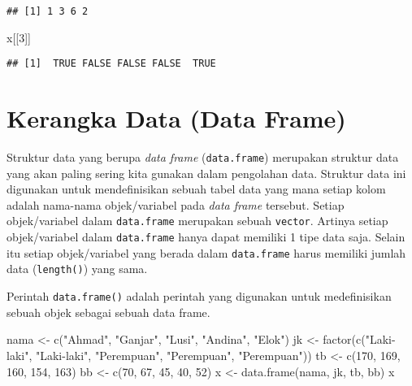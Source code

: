 \documentclass[
]{book}
\newenvironment{Shaded}{\begin{snugshade}}{\end{snugshade}}
\newcommand{\DecValTok}[1]{\textcolor[rgb]{0.00,0.00,0.81}{#1}}
\newcommand{\FunctionTok}[1]{\textcolor[rgb]{0.00,0.00,0.00}{#1}}
\newcommand{\NormalTok}[1]{#1}
\newcommand{\OtherTok}[1]{\textcolor[rgb]{0.56,0.35,0.01}{#1}}
\newcommand{\StringTok}[1]{\textcolor[rgb]{0.31,0.60,0.02}{#1}}
\begin{document}
\begin{verbatim}
## [1] 1 3 6 2
\end{verbatim}

\begin{Shaded}
\begin{Highlighting}[]
\NormalTok{x[[}\DecValTok{3}\NormalTok{]]}
\end{Highlighting}
\end{Shaded}

\begin{verbatim}
## [1]  TRUE FALSE FALSE FALSE  TRUE
\end{verbatim}

\hypertarget{dataframe}{%
\section{Kerangka Data (Data Frame)}\label{dataframe}}

Struktur data yang berupa \emph{data frame} (\texttt{data.frame}) merupakan struktur data yang akan paling sering kita gunakan dalam pengolahan data. Struktur data ini digunakan untuk mendefinisikan sebuah tabel data yang mana setiap kolom adalah nama-nama objek/variabel pada \emph{data frame} tersebut. Setiap objek/variabel dalam \texttt{data.frame} merupakan sebuah \texttt{vector}. Artinya setiap objek/variabel dalam \texttt{data.frame} hanya dapat memiliki 1 tipe data saja. Selain itu setiap objek/variabel yang berada dalam \texttt{data.frame} harus memiliki jumlah data (\texttt{length()}) yang sama.

Perintah \texttt{data.frame()} adalah perintah yang digunakan untuk medefinisikan sebuah objek sebagai sebuah data frame.

\begin{Shaded}
\begin{Highlighting}[]
\NormalTok{nama }\OtherTok{\textless{}{-}} \FunctionTok{c}\NormalTok{(}\StringTok{"Ahmad"}\NormalTok{, }\StringTok{"Ganjar"}\NormalTok{, }\StringTok{"Lusi"}\NormalTok{, }\StringTok{"Andina"}\NormalTok{, }\StringTok{"Elok"}\NormalTok{)}
\NormalTok{jk   }\OtherTok{\textless{}{-}} \FunctionTok{factor}\NormalTok{(}\FunctionTok{c}\NormalTok{(}\StringTok{"Laki{-}laki"}\NormalTok{, }\StringTok{"Laki{-}laki"}\NormalTok{, }\StringTok{"Perempuan"}\NormalTok{, }\StringTok{"Perempuan"}\NormalTok{, }\StringTok{"Perempuan"}\NormalTok{))}
\NormalTok{tb   }\OtherTok{\textless{}{-}} \FunctionTok{c}\NormalTok{(}\DecValTok{170}\NormalTok{, }\DecValTok{169}\NormalTok{, }\DecValTok{160}\NormalTok{, }\DecValTok{154}\NormalTok{, }\DecValTok{163}\NormalTok{)}
\NormalTok{bb   }\OtherTok{\textless{}{-}} \FunctionTok{c}\NormalTok{(}\DecValTok{70}\NormalTok{, }\DecValTok{67}\NormalTok{, }\DecValTok{45}\NormalTok{, }\DecValTok{40}\NormalTok{, }\DecValTok{52}\NormalTok{)}
\NormalTok{x    }\OtherTok{\textless{}{-}} \FunctionTok{data.frame}\NormalTok{(nama, jk, tb, bb)}
\NormalTok{x}
\end{Highlighting}
\end{Shaded}
\end{document}
